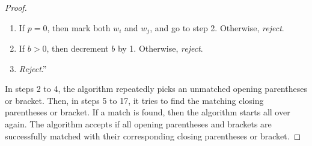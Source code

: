 \documentclass[11pt]{article}
\begin{document}
\begin{proof}
\begin{enumerate}
\item \hspace*{1.5cm} If $p = 0$, then mark both $w_i$ and $w_j$, and go to step 2. Otherwise, \textit{reject}.
\item \hspace*{1.0cm} If $b > 0$, then decrement $b$ by 1. Otherwise, \textit{reject}.
\item \textit{Reject}.\textquotedblright
\end{enumerate}
In steps 2 to 4, the algorithm repeatedly picks an unmatched opening parentheses or bracket. Then, in steps 5 to 17, it tries to find the matching closing parentheses or bracket. If a match is found, then the algorithm starts all over again. The algorithm accepts if all opening parentheses and brackets are successfully matched with their corresponding closing parentheses or bracket.
\end{proof}
\end{document}
